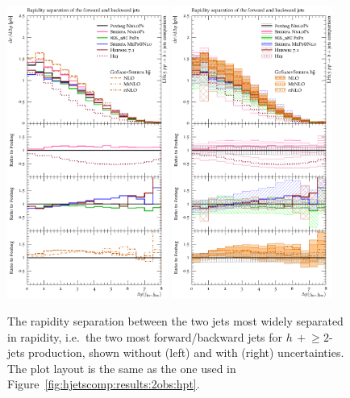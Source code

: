 \begin{figure}[t!]
  \centering
  \includegraphics[width=0.47\textwidth]{figures/hjetscomp_u_jjdy_dy.pdf}
  \hfill
  \includegraphics[width=0.47\textwidth]{figures/hjetscomp_jjdy_dy.pdf}
  \caption{\label{fig:hjetscomp:results:2obs:dyjj_fb}%
    The rapidity separation between the two jets most widely separated
    in rapidity, i.e.~the two most forward/backward jets for
    $h\,+\!\ge\!2$-jets production, shown without (left) and with
    (right) uncertainties. The plot layout is the same as the one used
    in Figure~\ref{fig:hjetscomp:results:2obs:hpt}.}
\end{figure}

